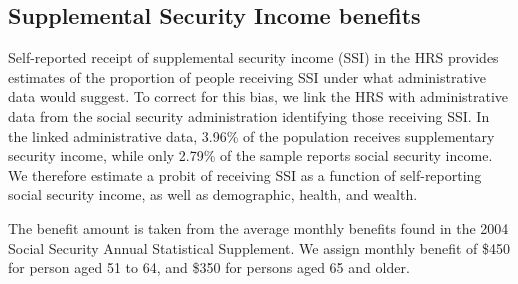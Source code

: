 \subsection{Supplemental Security Income benefits}
Self-reported receipt of supplemental security income (SSI) in the HRS provides estimates of the proportion of people receiving SSI under 
what administrative data would suggest. To correct for this bias, we link the HRS with administrative data from the social security 
administration identifying those receiving SSI. In the linked administrative data, 3.96\% of the population receives supplementary security 
income, while only 2.79\% of the sample reports social security income. We therefore estimate a probit of receiving SSI as a function of 
self-reporting social security income, as well as demographic, health, and wealth. 
	
The benefit amount is taken from the average monthly benefits found in the 2004 Social Security Annual Statistical Supplement. We assign 
monthly benefit of \$450 for person aged 51 to 64, and \$350 for persons aged 65 and older.

